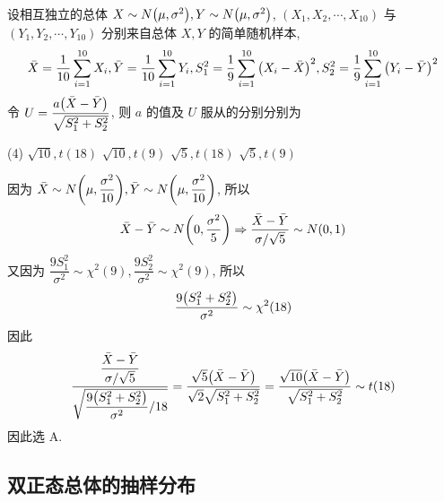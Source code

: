 \begin{example}
    设相互独立的总体 $X\sim N\qty(\mu,\sigma^2),Y\sim N\qty(\mu,\sigma^2)$, $(X_1, X_2, \cdots ,X_{10})$ 与 $(Y_1, Y_2, \cdots ,Y_{10})$ 分别来自总体 $X,Y$ 的简单随机样本,
    $$
    \bar{X}=\dfrac{1}{10}\sum_{i=1}^{10} X_i, \bar{Y}=\dfrac{1}{10}\sum_{i=1}^{10} Y_i, S_1^2=\dfrac{1}{9}\sum_{i=1}^{10} \qty(X_i-\bar{X})^2,S_2^2=\dfrac{1}{9}\sum_{i=1}^{10} \qty(Y_i-\bar{Y})^2
    $$
    令 $U=\dfrac{a\qty(\bar{X}-\bar{Y})}{\sqrt{S_1^2+S_2^2}}$, 则 $a$ 的值及 $U$ 服从的分别分别为 
    \begin{tasks}(4)
        \task $\sqrt{10},t(18)$
        \task $\sqrt{10},t(9)$
        \task $\sqrt{5},t(18)$
        \task $\sqrt{5},t(9)$
    \end{tasks}
\end{example}
\begin{solution}
    因为 $\bar{X}\sim N\qty(\mu,\dfrac{\sigma^2}{10}),\bar{Y}\sim N\qty(\mu,\dfrac{\sigma^2}{10})$, 所以 $$
    \bar{X}-\bar{Y}\sim N\qty(0,\dfrac{\sigma^2}{5})\Rightarrow \dfrac{\bar{X}-\bar{Y}}{\sigma /\sqrt{5}}\sim N(0,1)
    $$
    又因为 $\dfrac{9S_1^2}{\sigma^2}\sim \chi^2(9),\dfrac{9S_2^2}{\sigma^2}\sim \chi^2(9)$, 所以 $$
    \dfrac{9\qty(S_1^2+S_2^2)}{\sigma^2}\sim \chi^2(18)
    $$
    因此 $$
    \dfrac{\dfrac{\bar{X}-\bar{Y}}{\sigma /\sqrt{ 5}}}{\sqrt{\dfrac{9\qty(S_1^2+S_2^2)}{\sigma^2}/18} }=\dfrac{\sqrt{5}\qty(\bar{X}-\bar{Y})}{\sqrt{2}\sqrt{S_1^2+S_2^2}}=\dfrac{\sqrt{10}\qty(\bar{X}-\bar{Y})}{\sqrt{S_1^2+S_2^2}}\sim t(18)
    $$
    因此选 A.
\end{solution}

\subsection{双正态总体的抽样分布}

